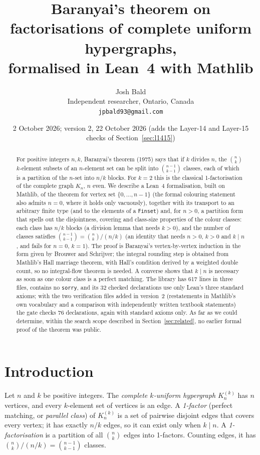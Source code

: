 \documentclass[11pt]{article}
\title{Baranyai's theorem on factorisations of complete uniform hypergraphs,\\ formalised in
Lean~4 with Mathlib}
\author{Josh Bald\\ \small Independent researcher, Ontario, Canada\\ \small\texttt{jpbald93@gmail.com}}
\date{2 October 2026; version 2, 22 October 2026 (adds the Layer-14 and Layer-15 checks of
Section~\ref{sec:l1415})}
\theoremstyle{definition}
\theoremstyle{remark}
\newcommand{\lean}[1]{\texttt{#1}}
\begin{document}
\maketitle

\begin{abstract}
For positive integers $n,k$, Baranyai's theorem (1975) says that if $k$ divides $n$, the $\binom nk$ $k$-element subsets of an
$n$-element set can be split into $\binom{n-1}{k-1}$ classes, each of which is a partition of the
$n$-set into $n/k$ blocks. For $k=2$ this is the classical 1-factorisation of the complete graph
$K_n$, $n$ even. We describe a Lean~4 formalisation, built on Mathlib, of the theorem for vertex
set $\{0,\dots,n-1\}$ (the formal colouring statement also admits $n=0$, where it holds only
vacuously), together with its transport to an arbitrary finite type (and to the
elements of a \lean{Finset}) and, for $n>0$, a partition form that spells out the disjointness,
covering and class-size properties of the colour classes: each class has $n/k$ blocks (a division
lemma that needs $k>0$), and the number of classes satisfies $\binom{n-1}{k-1}=\binom nk/(n/k)$ (an
identity that needs $n>0$, $k>0$ and $k\mid n$, and fails for $n=0$, $k=1$). The proof is Baranyai's vertex-by-vertex induction in the form
given by Brouwer and Schrijver; the integral rounding step is obtained from Mathlib's Hall marriage
theorem, with Hall's condition derived by a weighted double count, so no integral-flow theorem is
needed. A converse shows that $k\mid n$ is necessary as soon as one colour class is a perfect
matching. The library has 617 lines in three files, contains no \lean{sorry}, and its 32 checked
declarations use only Lean's three standard axioms; with the two verification files added in
version~2 (restatements in Mathlib's own vocabulary and a comparison with independently written
textbook statements) the gate checks 76 declarations, again with standard axioms only. As far as we could determine, within the search
scope described in Section~\ref{sec:related}, no earlier formal proof of the theorem was public.
\end{abstract}

\section{Introduction}

Let $n$ and $k$ be positive integers. The \emph{complete $k$-uniform hypergraph} $K_n^{(k)}$ has $n$
vertices, and every $k$-element set of vertices is an edge. A \emph{1-factor} (perfect matching,
or \emph{parallel class}) of $K_n^{(k)}$ is a set of pairwise disjoint edges that covers every
vertex; it has exactly $n/k$ edges, so it can exist only when $k\mid n$. A \emph{1-factorisation}
is a partition of all $\binom nk$ edges into 1-factors. Counting edges, it has
$\binom nk/(n/k)=\binom{n-1}{k-1}$ classes.
\end{document}

